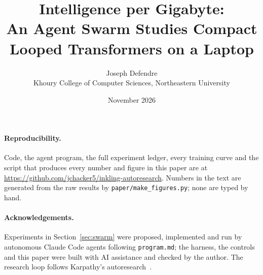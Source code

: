 \documentclass[11pt]{article}
\title{\textbf{Intelligence per Gigabyte:}\\
An Agent Swarm Studies Compact Looped Transformers on a Laptop}
\author{Joseph Defendre\\Khoury College of Computer Sciences, Northeastern University}
\date{November 2026}
\begin{document}
\maketitle

\begin{abstract}

\end{abstract}







\paragraph{Reproducibility.} Code, the agent program, the full experiment ledger, every training curve
and the script that produces every number and figure in this paper are at
\url{https://github.com/jchacker5/inkling-autoresearch}. Numbers in the text are generated from the raw
results by \texttt{paper/make\_figures.py}; none are typed by hand.

\paragraph{Acknowledgements.} Experiments in Section~\ref{sec:swarm} were proposed, implemented and run
by autonomous Claude Code agents following \texttt{program.md}; the harness, the controls and this paper
were built with AI assistance and checked by the author. The research loop follows Karpathy's
autoresearch~\cite{karpathy2026autoresearch}.




\appendix

\end{document}
